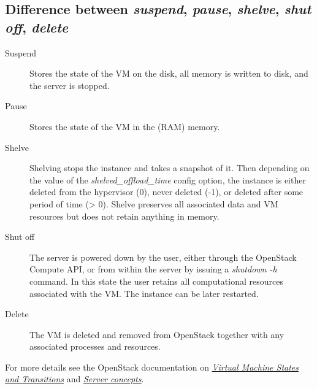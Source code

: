 \subsection*{Difference between \emph{suspend}, \emph{pause}, \emph{shelve}, \emph{shut off}, \emph{delete}}\label{server-power-down-states}

\begin{description}
\item[Suspend] Stores the state of the VM on the disk, all memory is written to disk, and the server is stopped.
\item[Pause] Stores the state of the VM in the (RAM) memory.
\item[Shelve] Shelving stops the instance and takes a snapshot of it. Then depending on the value of the \emph{shelved\_offload\_time} config option, the instance is either deleted from the hypervisor (0), never deleted (-1), or deleted after some period of time (> 0). Shelve preserves all associated data and VM resources but does not retain anything in memory.
\item[Shut off] The server is powered down by the user, either through the OpenStack Compute API, or from within the server by issuing a \emph{shutdown -h} command. In this state the user retains all computational resources associated with the VM. The instance can be later restarted.
\item[Delete] The VM is deleted and removed from \gls{OpenStack} together with any associated processes and resources.
\end{description}

For more details see the OpenStack documentation on \href{https://docs.openstack.org/nova/\osversion/reference/vm-states.html}{\emph{Virtual Machine States and Transitions}} and \href{https://developer.openstack.org/api-guide/compute/server_concepts.html}{\emph{Server concepts}}.

